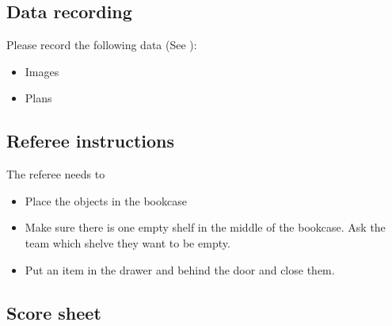 \subsection{Data recording}
  Please record the following data (See ):
  \begin{itemize}
   \item Images
   \item Plans
  \end{itemize}

\subsection{Referee instructions}

The referee needs to
\begin{itemize}
\item Place the objects in the bookcase
\item Make sure there is one empty shelf in the middle of the bookcase. Ask the team which shelve they want to be empty.
\item Put an item in the drawer and behind the door and close them.
\end{itemize}

\subsection{Score sheet}


